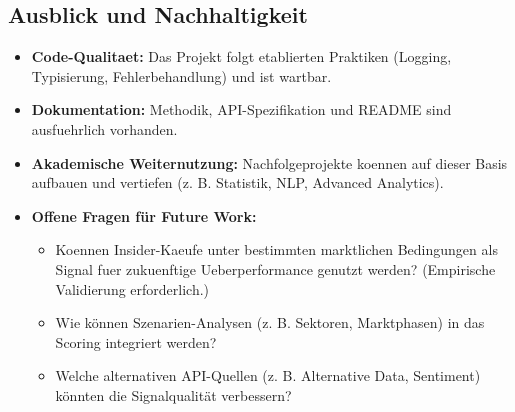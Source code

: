 \subsection{Ausblick und Nachhaltigkeit}
\begin{itemize}
  \item \textbf{Code-Qualitaet:} Das Projekt folgt etablierten Praktiken (Logging, Typisierung, Fehlerbehandlung) und ist wartbar. %
  \item \textbf{Dokumentation:} Methodik, API-Spezifikation und README sind ausfuehrlich vorhanden. %
  \item \textbf{Akademische Weiternutzung:} Nachfolgeprojekte koennen auf dieser Basis aufbauen und vertiefen (z. B. Statistik, NLP, Advanced Analytics). %
  \item \textbf{Offene Fragen für Future Work:}
    \begin{itemize}
      \item Koennen Insider-Kaeufe unter bestimmten marktlichen Bedingungen als Signal fuer zukuenftige Ueberperformance genutzt werden? (Empirische Validierung erforderlich.) %
      \item Wie können Szenarien-Analysen (z. B. Sektoren, Marktphasen) in das Scoring integriert werden? %
      \item Welche alternativen API-Quellen (z. B. Alternative Data, Sentiment) könnten die Signalqualität verbessern? %
    \end{itemize}
\end{itemize}
